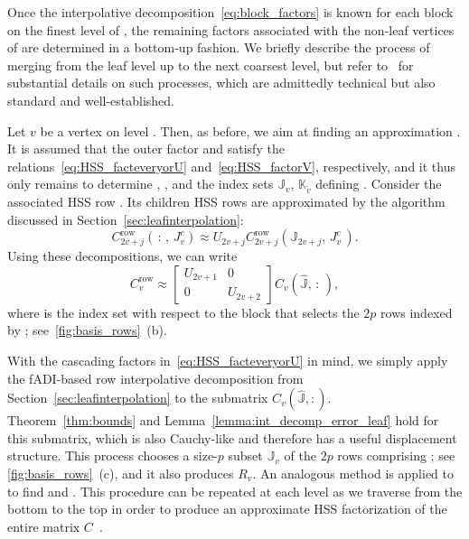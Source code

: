 Once the interpolative decomposition~\eqref{eq:block_factors} is known for each block on the finest level \smash{$\widehat{\ell}$} of , the remaining factors associated with the non-leaf vertices of  are determined
in a bottom-up fashion. We briefly describe the process of merging from the leaf level up to the next coarsest level, but refer to~\cite{wilber2021computing} for substantial details on such processes, which are admittedly technical but also standard and well-established.

Let $v$ be a vertex on level . Then, as before, we aim at finding an approximation . It is assumed that the outer factor   and  satisfy the relations~\eqref{eq:HSS_facteveryorU} and~\eqref{eq:HSS_factorV}, respectively, and it thus only remains to determine , , and the index sets $\mathbb J_v$, $\mathbb K_{\tilde{v}}$ defining .  Consider the associated HSS row . Its children HSS rows  are approximated by the algorithm discussed in Section~\ref{sec:leafinterpolation}:
$$C_{2v+j}^{\mathrm{row}}(\, : \, , \, J_v^c) \approx U_{2 v+j} C_{2v+j}^{\mathrm{row}}(\mathbb{J}_{2v+j}, \, J_v^c\,).$$ Using these decompositions, we can write
\begin{equation} 
\label{eq:non_leaf_row}
 C_v^{\mathrm{row}} \approx \begin{bmatrix} U_{2v+1} & 0 \\ 0 & U_{2v+2} \end{bmatrix} C_v(\widehat{\mathbb J}, \, : \,),
 \end{equation} 
where  is the index set with respect to the block  that selects the $2p$ rows indexed by ; see~\cref{fig:basis_rows}~(b).  

With the cascading factors in~\eqref{eq:HSS_facteveryorU} in mind, we simply apply the fADI-based row interpolative decomposition from Section~\ref{sec:leafinterpolation} to the submatrix $C_v(\widehat{\mathbb J},:)$.  Theorem~\ref{thm:bounds} and Lemma~\ref{lemma:int_decomp_error_leaf} hold for this submatrix, which is also Cauchy-like and therefore has a useful displacement structure. 
This process chooses a size-$p$ subset $\mathbb J_v$ of the $2 p$ rows comprising ; see \cref{fig:basis_rows}~(c), and it also produces $R_v$.  An analogous method is applied to  to find  and . This procedure can be repeated at each level as we traverse  from the bottom to the top in order to produce an approximate HSS factorization of the entire matrix $C$~\cite{martinsson2011fast}. 


